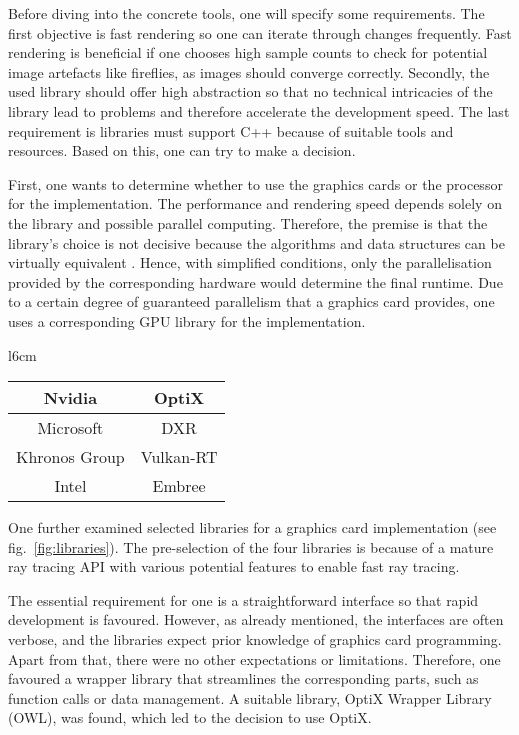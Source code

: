 Before diving into the concrete tools, one will specify some requirements.
The first objective is fast rendering so one can iterate through changes frequently.
Fast rendering is beneficial if one chooses high sample counts to check for potential image artefacts like fireflies, as images should converge correctly.
Secondly, the used library should offer high abstraction so that no technical intricacies of the library lead to problems and therefore accelerate the development speed.
The last requirement is libraries must support C++ because of suitable tools and resources.
Based on this, one can try to make a decision.

First, one wants to determine whether to use the graphics cards or the processor for the implementation.
The performance and rendering speed depends solely on the library and possible parallel computing.
Therefore, the premise is that the library's choice is not decisive because the algorithms and data structures can be virtually equivalent \cite{bico_optix_2016}.
Hence, with simplified conditions, only the parallelisation provided by the corresponding hardware would determine the final runtime. 
Due to a certain degree of guaranteed parallelism that a graphics card provides, one uses a corresponding GPU library for the implementation.

\begin{wraptable}{l}{6cm}
    \begin{tabular}{|c|c|}\hline
        Nvidia        & OptiX     \\ \hline
        Microsoft     & DXR       \\ \hline
        Khronos Group & Vulkan-RT \\ \hline
        Intel         & Embree    \\ \hline
    \end{tabular}
    \caption{libraries}
    \label{fig:libraries}
\end{wraptable}

One further examined selected libraries for a graphics card implementation (see fig.~\ref{fig:libraries}).
The pre-selection of the four libraries is because of a mature ray tracing API with various potential features to enable fast ray tracing.

The essential requirement for one is a straightforward interface so that rapid development is favoured.
However, as already mentioned, the interfaces are often verbose, and the libraries expect prior knowledge of graphics card programming.
Apart from that, there were no other expectations or limitations.
Therefore, one favoured a wrapper library that streamlines the corresponding parts, such as function calls or data management.
A suitable library, OptiX Wrapper Library (OWL), was found, which led to the decision to use OptiX. 


